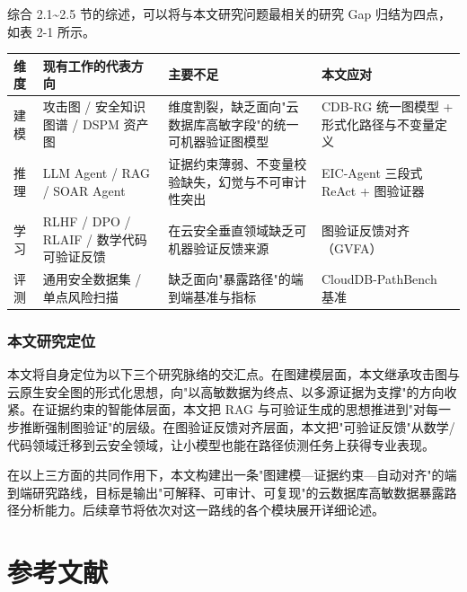 \documentclass[a4paper,12pt]{ctexart}
\begin{document}
综合 2.1\textasciitilde{}2.5 节的综述，可以将与本文研究问题最相关的研究 Gap 归结为四点，如表 2-1 所示。

\begin{table}[htbp]
\centering
\small
\setlength{\tabcolsep}{4pt}
\begin{tabular}{|l|l|l|l|}
\hline
\textbf{维度} & \textbf{现有工作的代表方向} & \textbf{主要不足} & \textbf{本文应对} \\
\hline
建模 & 攻击图 / 安全知识图谱 / DSPM 资产图 & 维度割裂，缺乏面向"云数据库高敏字段"的统一可机器验证图模型 & CDB-RG 统一图模型 + 形式化路径与不变量定义 \\
\hline
推理 & LLM Agent / RAG / SOAR Agent & 证据约束薄弱、不变量校验缺失，幻觉与不可审计性突出 & EIC-Agent 三段式 ReAct + 图验证器 \\
\hline
学习 & RLHF / DPO / RLAIF / 数学代码可验证反馈 & 在云安全垂直领域缺乏可机器验证反馈来源 & 图验证反馈对齐（GVFA） \\
\hline
评测 & 通用安全数据集 / 单点风险扫描 & 缺乏面向"暴露路径"的端到端基准与指标 & CloudDB-PathBench 基准 \\
\hline
\end{tabular}
\end{table}

\subsubsection{本文研究定位}

本文将自身定位为以下三个研究脉络的交汇点。在图建模层面，本文继承攻击图与云原生安全图的形式化思想，向"以高敏数据为终点、以多源证据为支撑"的方向收紧。在证据约束的智能体层面，本文把 RAG 与可验证生成的思想推进到"对每一步推断强制图验证"的层级。在图验证反馈对齐层面，本文把"可验证反馈"从数学/代码领域迁移到云安全领域，让小模型也能在路径侦测任务上获得专业表现。

在以上三方面的共同作用下，本文构建出一条"图建模—证据约束—自动对齐"的端到端研究路线，目标是输出"可解释、可审计、可复现"的云数据库高敏数据暴露路径分析能力。后续章节将依次对这一路线的各个模块展开详细论述。

\section{参考文献}
\end{document}
